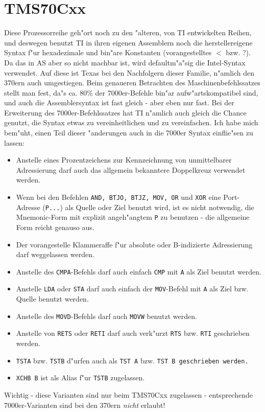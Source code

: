 \documentclass[12pt,a4paper,twoside]{report}
\newcommand{\tty}[1]{{\tt #1}}
\begin{document}

\section{TMS70Cxx}

Diese Prozessorreihe geh"ort noch zu den "alteren, von TI entwickelten
Reihen, und deswegen benutzt TI in ihren eigenen Assemblern noch die
herstellereigene Syntax f"ur hexadezimale und bin"are Konstanten
(vorangestelltes $<$ bzw. ?).  Da das in AS aber so nicht machbar ist, wird
defaultm"a"sig die Intel-Syntax verwendet.  Auf diese ist Texas bei den
Nachfolgern dieser Familie, n"amlich den 370ern auch umgestiegen.  Beim
genaueren Betrachten des Maschinenbefehlssatzes stellt man fest, da"s
ca. 80\% der 7000er-Befehle bin"ar aufw"artskompatibel sind, und auch die
Assemblersyntax ist fast gleich - aber eben nur fast.  Bei der Erweiterung
des 7000er-Befehlssatzes hat TI n"amlich auch gleich die Chance genutzt,
die Syntax etwas zu vereinheitlichen und zu vereinfachen.  Ich habe mich
bem"uht, einen Teil dieser "anderungen auch in die 7000er Syntax
einflie"sen zu lassen:
\begin{itemize}
\item{Anstelle eines Prozentzeichens zur Kennzeichnung von
      unmittelbarer Adressierung darf auch das allgemein bekanntere Doppelkreuz
      verwendet werden.}
\item{Wenn bei den Befehlen \tty{AND, BTJO, BTJZ, MOV, OR} und
      \tty{XOR} eine Port-Adresse (\tty{P...}) als Quelle oder Ziel
      benutzt wird, ist es nicht notwendig, die Mnemonic-Form mit explizit
      angeh"angtem \tty{P} zu benutzen - die allgemeine Form reicht genauso
      aus.}
\item{Der vorangestelle Klammeraffe f"ur absolute oder B-indizierte
      Adressierung darf weggelassen werden.}
\item{Anstelle des \tty{CMPA}-Befehls darf auch einfach
      \tty{CMP} mit \tty{A} als Ziel benutzt werden.}
\item{Anstelle \tty{LDA} oder \tty{STA} darf auch einfach der \tty{MOV}-Befehl
      mit \tty{A} als Ziel bzw. Quelle benutzt werden.}
\item{Anstelle des \tty{MOVD}-Befehls darf auch \tty{MOVW} benutzt werden.}
\item{Anstelle von \tty{RETS} oder \tty{RETI} darf auch verk"urzt
      \tty{RTS} bzw. \tty{RTI} geschrieben werden.}
\item{\tty{TSTA} bzw. \tty{TSTB} d"urfen auch als \tty{TST A} bzw. \tt{TST
      B} geschrieben werden.}
\item{\tty{XCHB B} ist als Alias f"ur \tty{TSTB} zugelassen.}
\end{itemize}
Wichtig - diese Varianten sind nur beim TMS70Cxx zugelassen - entsprechende
7000er-Varianten sind bei den 370ern {\em nicht} erlaubt!
\end{document}
